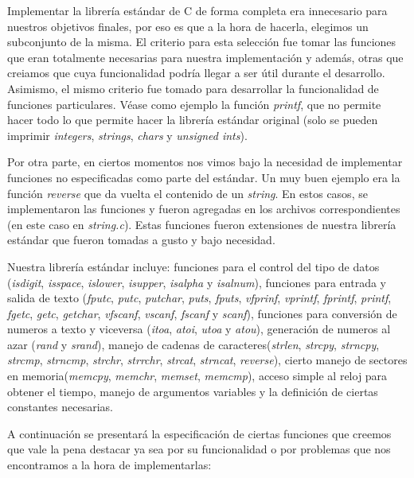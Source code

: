 \documentclass[a4paper,10pt]{article}
\begin{document}
    Implementar la librería estándar de C de forma completa era innecesario para nuestros objetivos finales, por eso es que a la hora de hacerla, elegimos un subconjunto de la misma. El criterio para esta selección fue tomar las funciones que eran totalmente necesarias para nuestra implementación y además, otras que creiamos que cuya funcionalidad podría llegar a ser útil durante el desarrollo.
    Asimismo, el mismo criterio fue tomado para desarrollar la funcionalidad de funciones particulares. Véase como ejemplo la función \textit{printf}, que no permite hacer todo lo que permite hacer la librería estándar original (solo se pueden imprimir \textit{integers}, \textit{strings}, \textit{chars} y \textit{unsigned ints}).

    Por otra parte, en ciertos momentos nos vimos bajo la necesidad de implementar funciones no especificadas como parte del estándar. Un muy buen ejemplo era la función \textit{reverse} que da vuelta el contenido de un \textit{string}. En estos casos, se implementaron las funciones y fueron agregadas en los archivos correspondientes (en este caso en \textit{string.c}). Estas funciones fueron extensiones de nuestra librería estándar que fueron tomadas a gusto y bajo necesidad.

    Nuestra librería estándar incluye: funciones para el control del tipo de datos (\textit{isdigit}, \textit{isspace}, \textit{islower}, \textit{isupper}, \textit{isalpha} y \textit{isalnum}), funciones para entrada y salida de texto (\textit{fputc}, \textit{putc}, \textit{putchar}, \textit{puts}, \textit{fputs}, \textit{vfprinf}, \textit{vprintf}, \textit{fprintf}, \textit{printf}, \textit{fgetc}, \textit{getc}, \textit{getchar}, \textit{vfscanf}, \textit{vscanf}, \textit{fscanf} y \textit{scanf}), funciones para conversión de numeros a texto y viceversa (\textit{itoa}, \textit{atoi}, \textit{utoa} y \textit{atou}), generación de numeros al azar (\textit{rand} y \textit{srand}), manejo de cadenas de caracteres(\textit{strlen}, \textit{strcpy}, \textit{strncpy}, \textit{strcmp}, \textit{strncmp}, \textit{strchr}, \textit{strrchr}, \textit{strcat}, \textit{strncat}, \textit{reverse}), cierto manejo de sectores en memoria(\textit{memcpy}, \textit{memchr}, \textit{memset}, \textit{memcmp}), acceso simple al reloj para obtener el tiempo, manejo de argumentos variables y la definición de ciertas constantes necesarias.

    A continuación se presentará la especificación de ciertas funciones que creemos que vale la pena destacar ya sea por su funcionalidad o por problemas que nos encontramos a la hora de implementarlas:
\end{document}
